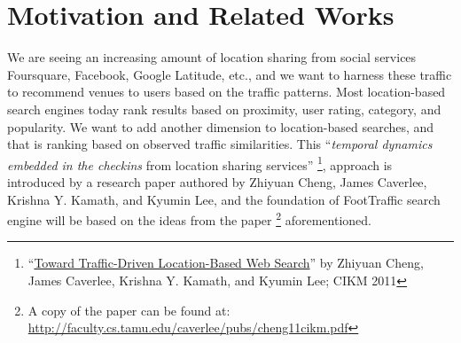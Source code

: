 \documentclass{article}
\begin{document}
%


%
\section{Motivation and Related Works}
We are seeing an increasing amount of location sharing from social services Foursquare, Facebook, Google Latitude, etc.,
and we want to harness these traffic to recommend venues to users based on the traffic patterns. Most location-based
search engines today rank results based on proximity, user rating, category, and popularity. We want to add another 
dimension to location-based searches, and that is ranking based on observed traffic similarities.
This ``\textit{temporal dynamics embedded in the checkins} from location sharing services''
\footnote{``\href{http://faculty.cs.tamu.edu/caverlee/pubs/cheng11cikm.pdf}{Toward Traffic-Driven Location-Based Web Search}''
  by Zhiyuan Cheng, James Caverlee, Krishna Y. Kamath, and Kyumin Lee; CIKM 2011},
approach is introduced by a research paper authored by Zhiyuan Cheng, James Caverlee, Krishna Y. Kamath,
and Kyumin Lee, and the foundation of FootTraffic search engine will be based on the ideas from the paper
\footnote{A copy of the paper can be found at: \url{http://faculty.cs.tamu.edu/caverlee/pubs/cheng11cikm.pdf}}
aforementioned.
\end{document}
